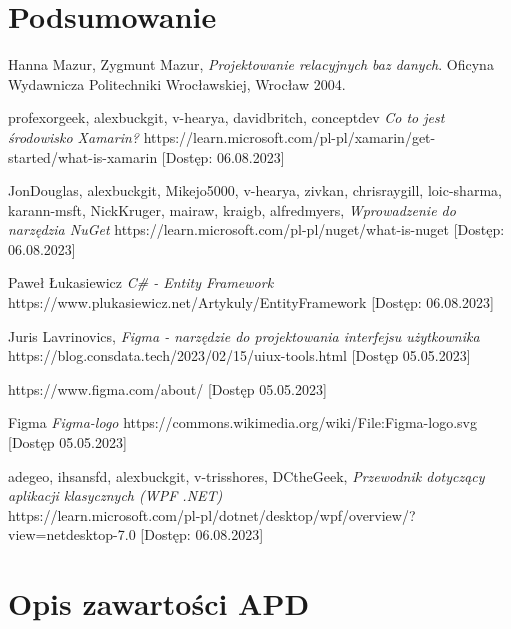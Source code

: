 \documentclass[12pt,twoside]{report}
\begin{document}
\chapter{Podsumowanie}
\begin{thebibliography}{9}
	
	Hanna Mazur, Zygmunt Mazur,
	\emph{Projektowanie relacyjnych baz danych}.
	Oficyna Wydawnicza Politechniki Wrocławskiej, Wrocław 2004.

	 profexorgeek, alexbuckgit, v-hearya, davidbritch, conceptdev \emph{Co to jest środowisko Xamarin?}
	https://learn.microsoft.com/pl-pl/xamarin/get-started/what-is-xamarin [Dostęp: 06.08.2023] 

	 JonDouglas, alexbuckgit, Mikejo5000, v-hearya, zivkan, chrisraygill, loic-sharma, karann-msft, NickKruger,	mairaw, kraigb, alfredmyers, \emph{Wprowadzenie do narzędzia NuGet} https://learn.microsoft.com/pl-pl/nuget/what-is-nuget 
	[Dostęp: 06.08.2023]

	Paweł Łukasiewicz \emph{C\# - Entity Framework} https://www.plukasiewicz.net/Artykuly/EntityFramework
	[Dostęp: 06.08.2023]

	 Juris Lavrinovics, \emph{Figma - narzędzie do projektowania interfejsu użytkownika}
	https://blog.consdata.tech/2023/02/15/uiux-tools.html 
	[Dostęp 05.05.2023]

	https://www.figma.com/about/ 
	[Dostęp 05.05.2023]

	Figma \emph{Figma-logo} https://commons.wikimedia.org/wiki/File:Figma-logo.svg 
	[Dostęp 05.05.2023]
	
	 adegeo, ihsansfd, alexbuckgit, v-trisshores, DCtheGeek, \emph{Przewodnik dotyczący aplikacji klasycznych (WPF .NET)}\\ https://learn.microsoft.com/pl-pl/dotnet/desktop/wpf/overview/?view=netdesktop-7.0 
	[Dostęp: 06.08.2023]

\end{thebibliography}
\listoffigures
\lstlistoflistings
\listoftables
\chapter{Opis zawartości APD}
\end{document}
